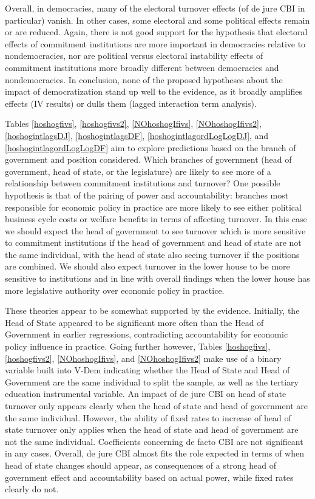\documentclass{article}
\begin{document}
    Overall, in democracies, many of the electoral turnover effects (of de jure CBI in particular) vanish. In other cases, some electoral and some political effects remain or are reduced. Again, there is not good support for the hypothesis that electoral effects of commitment institutions are more important in democracies relative to nondemocracies, nor are political versus electoral instability effects of commitment institutions more broadly different between democracies and nondemocracies. In conclusion, none of the proposed hypotheses about the impact of democratization stand up well to the evidence, as it broadly amplifies effects (IV results) or dulls them (lagged interaction term analysis).

    Tables \ref{hoshogfivs}, \ref{hoshogfivs2}, \ref{NOhoshogIfivs}, \ref{NOhoshogIfivs2}, \ref{hoshogintlagsDJ}, \ref{hoshogintlagsDF}, \ref{hoshogintlagordLogLogDJ}, and \ref{hoshogintlagordLogLogDF} aim to explore predictions based on the branch of government and position considered. Which branches of government (head of government, head of state, or the legislature) are likely to see more of a relationship between commitment institutions and turnover? One possible hypothesis is that of the pairing of power and accountability: branches most responsible for economic policy in practice are more likely to see either political business cycle costs or welfare benefits in terms of affecting turnover. In this case we should expect the head of government to see turnover which is more sensitive to commitment institutions if the head of government and head of state are not the same individual, with the head of state also seeing turnover if the positions are combined. We should also expect turnover in the lower house to be more sensitive to institutions and in line with overall findings when the lower house has more legislative authority over economic policy in practice.

    These theories appear to be somewhat supported by the evidence. Initially, the Head of State appeared to be significant more often than the Head of Government in earlier regressions, contradicting accountability for economic policy influence in practice. Going further however, Tables \ref{hoshogfivs}, \ref{hoshogfivs2}, \ref{NOhoshogIfivs}, and \ref{NOhoshogIfivs2} make use of a binary variable built into V-Dem indicating whether the Head of State and Head of Government are the same individual to split the sample, as well as the tertiary education instrumental variable.  An impact of de jure CBI on head of state turnover only appears clearly when the head of state and head of government are the same individual. However, the ability of fixed rates to increase of head of state turnover only applies when the head of state and head of government are not the same individual. Coefficients concerning de facto CBI are not significant in any cases. Overall, de jure CBI almost fits the role expected in terms of when head of state changes should appear, as consequences of a strong head of government effect and accountability based on actual power, while fixed rates clearly do not. 
\end{document}
